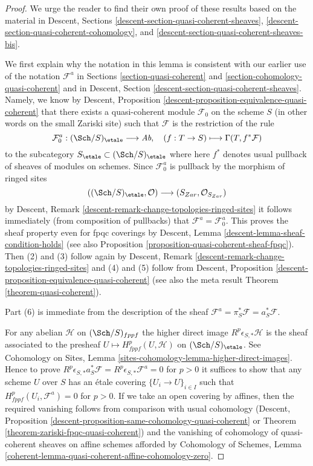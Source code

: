\begin{proof}
We urge the reader to find their own proof of these results
based on the material in
Descent, Sections \ref{descent-section-quasi-coherent-sheaves},
\ref{descent-section-quasi-coherent-cohomology}, and
\ref{descent-section-quasi-coherent-sheaves-bis}.

\medskip\noindent
We first explain why the notation in this lemma is consistent with our
earlier use of the notation $\mathcal{F}^a$ in
Sections \ref{section-quasi-coherent} and
\ref{section-cohomology-quasi-coherent}
and in
Descent, Section \ref{descent-section-quasi-coherent-sheaves}.
Namely, we know by
Descent, Proposition \ref{descent-proposition-equivalence-quasi-coherent}
that there exists a quasi-coherent module
$\mathcal{F}_0$ on the scheme $S$ (in other words on the small
Zariski site) such that $\mathcal{F}$ is the restriction of the
rule
$$
\mathcal{F}_0^a : (\Sch/S)_\etale \longrightarrow \textit{Ab},\quad
(f : T \to S) \longmapsto \Gamma(T, f^*\mathcal{F})
$$
to the subcategory $S_\etale \subset (\Sch/S)_\etale$
where here $f^*$ denotes usual pullback of sheaves of modules on schemes.
Since $\mathcal{F}_0^a$ is pullback by the morphism of ringed
sites
$$
((\Sch/S)_\etale, \mathcal{O}) \longrightarrow (S_{Zar}, \mathcal{O}_{S_{Zar}})
$$
by Descent, Remark \ref{descent-remark-change-topologies-ringed-sites}
it follows immediately (from composition of pullbacks) that
$\mathcal{F}^a = \mathcal{F}_0^a$. This proves the sheaf property
even for fpqc coverings by
Descent, Lemma \ref{descent-lemma-sheaf-condition-holds} (see also
Proposition \ref{proposition-quasi-coherent-sheaf-fpqc}).
Then (2) and (3) follow
again by Descent, Remark \ref{descent-remark-change-topologies-ringed-sites}
and (4) and (5) follow from
Descent, Proposition \ref{descent-proposition-equivalence-quasi-coherent}
(see also the meta result
Theorem \ref{theorem-quasi-coherent}).

\medskip\noindent
Part (6) is immediate from the description of the sheaf
$\mathcal{F}^a = \pi_S^*\mathcal{F} = a_S^*\mathcal{F}$.

\medskip\noindent
For any abelian $\mathcal{H}$ on $(\Sch/S)_{fppf}$ the
higher direct image $R^p\epsilon_{S, *}\mathcal{H}$ is the sheaf
associated to the presheaf $U \mapsto H^p_{fppf}(U, \mathcal{H})$
on $(\Sch/S)_\etale$. See
Cohomology on Sites, Lemma \ref{sites-cohomology-lemma-higher-direct-images}.
Hence to prove
$R^p\epsilon_{S, *}a_S^*\mathcal{F} = R^p\epsilon_{S, *}\mathcal{F}^a = 0$
for $p > 0$ it suffices to show that any scheme $U$ over $S$
has an \'etale covering $\{U_i \to U\}_{i \in I}$ such that
$H^p_{fppf}(U_i, \mathcal{F}^a) = 0$ for $p > 0$.
If we take an open covering by affines, then the required
vanishing follows from comparison with usual cohomology
(Descent, Proposition \ref{descent-proposition-same-cohomology-quasi-coherent}
or
Theorem \ref{theorem-zariski-fpqc-quasi-coherent})
and the vanishing of cohomology of quasi-coherent sheaves
on affine schemes afforded by Cohomology of Schemes, Lemma
\ref{coherent-lemma-quasi-coherent-affine-cohomology-zero}.


\end{proof}
